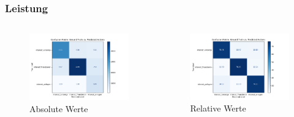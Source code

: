\documentclass{beamer}
\begin{document}
\begin{frame}
\label{sec7}
\frametitle{Leistung}

\centering

\begin{columns}
    \begin{figure}
        \centering
        \includegraphics[width=1\textwidth]{figures/cm.png}
        \caption{Absolute Werte}
    \end{figure}
    
    \begin{figure}
        \centering
        \includegraphics[width=1.\textwidth]{figures/cm_pct.png}
        \caption{Relative Werte}
    \end{figure}
\end{columns}


\end{frame}
\end{document}
